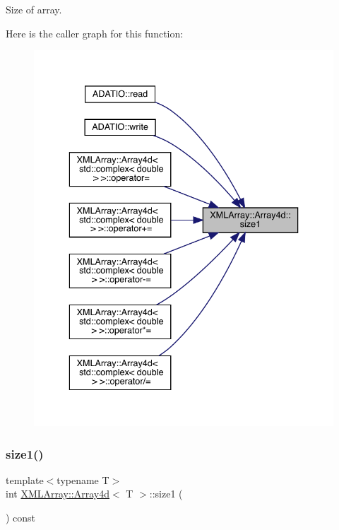 Size of array. 

Here is the caller graph for this function\+:\nopagebreak
\begin{figure}[H]
\begin{center}
\leavevmode
\includegraphics[width=336pt]{de/d16/classXMLArray_1_1Array4d_a27899b6dccfd5d85d299da80da9a4c14_icgraph}
\end{center}
\end{figure}
\mbox{\label{classXMLArray_1_1Array4d_a27899b6dccfd5d85d299da80da9a4c14}} 
\subsubsection{\texorpdfstring{size1()}{size1()}\hspace{0.1cm}{\footnotesize\ttfamily [2/2]}}
{\footnotesize\ttfamily template$<$typename T$>$ \\
int \mbox{\hyperlink{classXMLArray_1_1Array4d}{X\+M\+L\+Array\+::\+Array4d}}$<$ T $>$\+::size1 (\begin{DoxyParamCaption}{ }\end{DoxyParamCaption}) const\hspace{0.3cm}{\ttfamily [inline]}}



